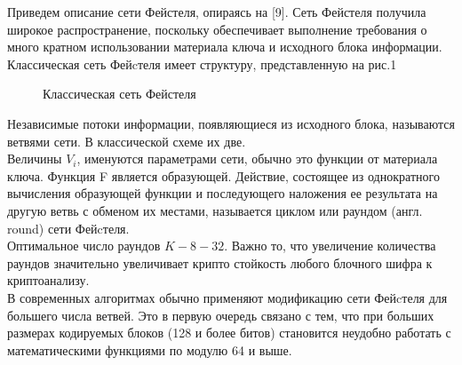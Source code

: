 \documentclass[oneside,final,14pt]{extreport}
\begin{document}
Приведем описание сети Фейстеля, опираясь на [9]. Сеть Фейстеля получила широкое распро­странение, поскольку обеспечивает выполнение требования о много­ кратном использовании материала ключа и исходного блока
информации.\\

Классическая сеть Фейcтеля имеет структуру, представленную
на рис.1 

\begin{figure}[h]

\caption{Классическая сеть Фейстеля}
\end{figure}



Независимые потоки информации, появляющиеся из исходного блока, называются ветвями сети. В классической схеме их две. \\

Величины $V_{i}$, именуются параметрами сети, обычно это функции от материала ключа. Функция F является образующей. Действие,
состоящее из однократного вычисления образующей функции и
последующего наложения ее результата на другую ветвь с обменом
их местами, называется циклом или раундом (англ. round) сети
Фейcтеля. \\


Оптимальное число раундов $K - 8-32$. Важно то, что
увеличение количества раундов значительно увеличивает крипто­
стойкость любого блочного шифра к криптоанализу.\\


В современных алгоритмах обычно применяют модификацию
сети Фейcтеля для большего числа ветвей. Это в первую очередь
связано с тем, что при больших размерах кодируемых блоков (128 и
более битов) становится неудобно работать с математическими
функциями по модулю 64 и выше.\\
\end{document}
